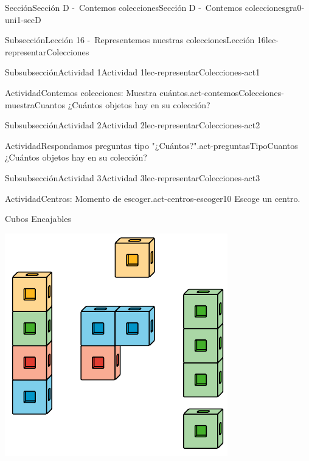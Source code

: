 \documentclass[twoside,10pt,]{article}
\begin{document}
\begin{sectionptx}{Sección}{Sección D -~Contemos colecciones}{}{Sección D -~Contemos colecciones}{}{}{gra0-uni1-secD}
\begin{subsectionptx}{Subsección}{Lección 16 -~Representemos nuestras colecciones}{}{Lección 16}{}{}{lec-representarColecciones}
\begin{subsubsectionptx}{Subsubsección}{Actividad 1}{}{Actividad 1}{}{}{lec-representarColecciones-act1}
\begin{activity}{Actividad}{Contemos colecciones: Muestra cuántos.}{act-contemosColecciones-muestraCuantos}
¿Cuántos objetos hay en su colección?%
\end{activity}%
\end{subsubsectionptx}
%
%
\typeout{************************************************}
\typeout{************************************************}
%
\begin{subsubsectionptx}{Subsubsección}{Actividad 2}{}{Actividad 2}{}{}{lec-representarColecciones-act2}
\begin{activity}{Actividad}{Respondamos preguntas tipo "¿Cuántos?".}{act-preguntasTipoCuantos}%
¿Cuántos objetos hay en su colección?%
\end{activity}%
\end{subsubsectionptx}
%
%
\typeout{************************************************}
\typeout{************************************************}
%
\begin{subsubsectionptx}{Subsubsección}{Actividad 3}{}{Actividad 3}{}{}{lec-representarColecciones-act3}
\begin{activity}{Actividad}{Centros: Momento de escoger.}{act-centros-escoger10}%
Escoge un centro.%
\begin{sidebyside}{2}{0.025}{0.025}{0.05}%
\begin{sbspanel}{0.45}%
Cubos Encajables%
\par
\includegraphics[width=\linewidth]{external/svg-source/tikz-file-128850.pdf}

\end{sbspanel}
\end{sidebyside}
\end{activity}
\end{subsubsectionptx}
\end{subsectionptx}
\end{sectionptx}
\end{document}
